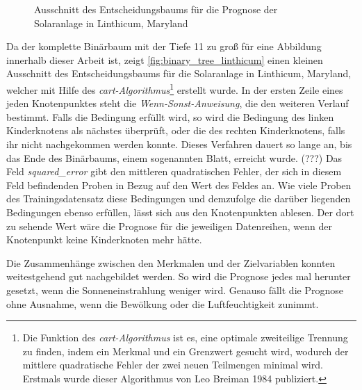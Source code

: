 \documentclass[12pt, a4paper]{article}
\begin{document}
\begin{figure}[H]
\centering
\def\svgwidth{425pt}

\caption{Ausschnitt des Entscheidungsbaums für die Prognose der Solaranlage in Linthicum, Maryland}
\label{fig:binary_tree_linthicum}
\end {figure}

Da der komplette Binärbaum mit der Tiefe 11 zu groß für eine Abbildung innerhalb dieser Arbeit ist, zeigt \autoref{fig:binary_tree_linthicum} einen kleinen Ausschnitt des Entscheidungsbaums für die Solaranlage in Linthicum, Maryland, welcher mit Hilfe des \textit{\ac{cart}-Algorithmus}\footnote{Die Funktion des \textit{\ac{cart}-Algorithmus} ist es, eine optimale zweiteilige Trennung zu finden, indem ein Merkmal und ein Grenzwert gesucht wird, wodurch der mittlere quadratische Fehler der zwei neuen Teilmengen minimal wird. Erstmals wurde dieser Algorithmus von Leo Breiman 1984 publiziert.} erstellt wurde. In der ersten Zeile eines jeden Knotenpunktes steht die \textit{Wenn-Sonst-Anweisung}, die den weiteren Verlauf bestimmt. Falls die Bedingung erfüllt wird, so wird die Bedingung des linken Kinderknotens als nächstes überprüft, oder die des rechten Kinderknotens, falls ihr nicht nachgekommen werden konnte. Dieses Verfahren dauert so lange an, bis das Ende des Binärbaums, einem sogenannten Blatt, erreicht wurde.
(???)
Das Feld \textit{squared\_error} gibt den mittleren quadratischen Fehler, der sich in diesem Feld befindenden Proben in Bezug auf den Wert des Feldes an. Wie viele Proben des Trainingsdatensatz diese Bedingungen und demzufolge die darüber liegenden Bedingungen ebenso erfüllen, lässt sich aus den Knotenpunkten ablesen. Der dort zu sehende Wert wäre die Prognose für die jeweiligen Datenreihen, wenn der Knotenpunkt keine Kinderknoten mehr hätte.

Die Zusammenhänge zwischen den Merkmalen und der Zielvariablen konnten weitestgehend gut nachgebildet werden. So wird die Prognose jedes mal herunter gesetzt, wenn die Sonneneinstrahlung weniger wird. Genauso fällt die Prognose ohne Ausnahme, wenn die Bewölkung oder die Luftfeuchtigkeit zunimmt. 
\end{document}
